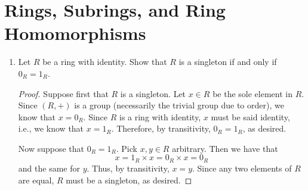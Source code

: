 \documentclass[../psets.tex]{subfiles}
\begin{document}
\section{Rings, Subrings, and Ring Homomorphisms}
\begin{enumerate}
    \item {}Let $R$ be a ring with identity. Show that $R$ is a singleton if and only if $0_R=1_R$.
    \begin{proof}
        Suppose first that $R$ is a singleton. Let $x\in R$ be the sole element in $R$. Since $(R,+)$ is a group (necessarily the trivial group due to order), we know that $x=0_R$. Since $R$ is a ring with identity, $x$ must be said identity, i.e., we know that $x=1_R$. Therefore, by transitivity, $0_R=1_R$, as desired.\par
        Now suppose that $0_R=1_R$. Pick $x,y\in R$ arbitrary. Then we have that
        \begin{equation*}
            x = 1_R\times x
            = 0_R\times x
            = 0_R
        \end{equation*}
        and the same for $y$. Thus, by transitivity, $x=y$. Since any two elements of $R$ are equal, $R$ must be a singleton, as desired.
    \end{proof}
\end{enumerate}
\end{document}
